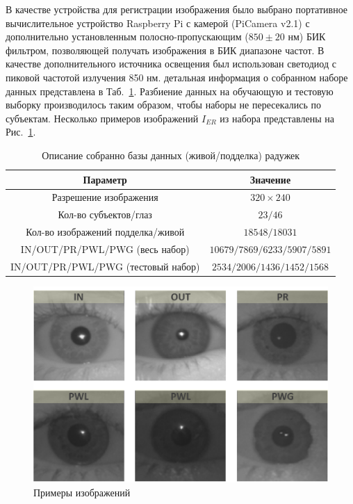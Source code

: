 В качестве устройства для регистрации изображения было выбрано портативное вычислительное устройство Raspberry Pi с камерой (PiCamera v2.1) с дополнительно установленным полосно-пропускающим ($850\pm20$ нм) БИК фильтром, позволяющей получать изображения в БИК диапазоне частот. В качестве дополнительного источника освещения был использован светодиод с пиковой частотой излучения 850 нм. детальная информация о собранном наборе данных представлена в Таб.~\ref{tab:spoof-dbdescription}. Разбиение данных на обучающую и тестовую выборку производилось таким образом, чтобы наборы не пересекались по субъектам. Несколько примеров изображений $I_{ER}$ из набора представлены на Рис.~\ref{fig:spoof-samples}.

\begin{table}[t]
	\caption{Описание собранно базы данных (живой/подделка) радужек}
	\begin{center}
		\begin{tabular}{|c|c|}
			\hline
			\textbf{Параметр}							&\textbf{Значение} \\
			\hline
			Разрешение изображения 						&	$320\times240$\\
			Кол-во субъектов/глаз						&	$23/46$\\
			Кол-во изображений подделка/живой			&	$18548/18031$\\
			IN/OUT/PR/PWL/PWG (весь набор)				& 	$10679/7869/6233/5907/5891$\\
			IN/OUT/PR/PWL/PWG (тестовый набор)			& 	$2534/2006/1436/1452/1568$\\
			\hline
		\end{tabular}
		\label{tab:spoof-dbdescription}
	\end{center}
\end{table}

\begin{figure}[t!]
	\centering
	\includegraphics[width=0.75\columnwidth]{pictures/spoof-samples.png}
	\caption{Примеры изображений}
	\label{fig:spoof-samples}
\end{figure}

